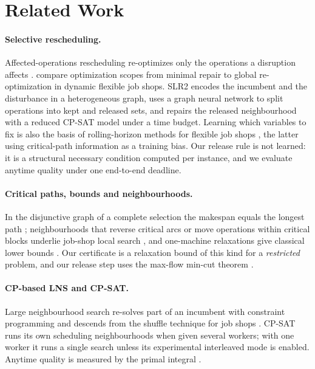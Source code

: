 \documentclass[letterpaper]{article} %
\begin{document}
\section{Related Work}

\paragraph{Selective rescheduling.} Affected-operations rescheduling re-optimizes only the operations a disruption affects \citep{abumaizar1997,subramaniam2003}. \citet{sun2026} compare optimization scopes from minimal repair to global re-optimization in dynamic flexible job shops. SLR2 \citep{linyang2026} encodes the incumbent and the disturbance in a heterogeneous graph, uses a graph neural network to split operations into kept and released sets, and repairs the released neighbourhood with a reduced CP-SAT model under a time budget. Learning which variables to fix is also the basis of rolling-horizon methods for flexible job shops \citep{li2025lrho,li2026graphrho}, the latter using critical-path information as a training bias. Our release rule is not learned: it is a structural necessary condition computed per instance, and we evaluate anytime quality under one end-to-end deadline.

\paragraph{Critical paths, bounds and neighbourhoods.} In the disjunctive graph of a complete selection the makespan equals the longest path \citep{balas1969}; neighbourhoods that reverse critical arcs or move operations within critical blocks underlie job-shop local search \citep{vanlaarhoven1992,nowicki1996,balas1998}, and one-machine relaxations give classical lower bounds \citep{carlier1982}. Our certificate is a relaxation bound of this kind for a \emph{restricted} problem, and our release step uses the max-flow min-cut theorem \citep{fordfulkerson1956,edmondskarp1972}.

\paragraph{CP-based LNS and CP-SAT.} Large neighbourhood search re-solves part of an incumbent with constraint programming \citep{shaw1998,godard2005,pacino2011} and descends from the shuffle technique for job shops \citep{applegate1991}. CP-SAT \citep{cpsat,perron2023} runs its own scheduling neighbourhoods when given several workers; with one worker it runs a single search unless its experimental interleaved mode is enabled. Anytime quality is measured by the primal integral \citep{berthold2013}.
\end{document}
